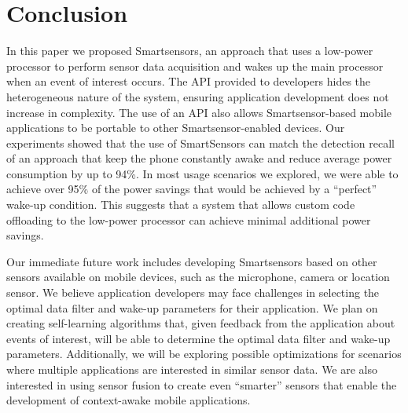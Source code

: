 \section{Conclusion}
\label{sec:conclusion}

In this paper we proposed Smartsensors, an approach that uses a low-power processor to perform sensor data acquisition and wakes up the main processor when an event of interest occurs. The API provided to developers hides the heterogeneous nature of the system, ensuring application development does not increase in complexity. The use of an API also allows Smartsensor-based mobile applications to be portable to other Smartsensor-enabled devices. Our experiments showed that the use of SmartSensors can match the detection recall of an approach that keep the phone constantly awake and reduce average power consumption by up to 94\%. In most usage scenarios we explored, we were able to achieve over 95\% of the power savings that would be achieved by a ``perfect'' wake-up condition. This suggests that a system that allows custom code offloading to the low-power processor can achieve minimal additional power savings.

Our immediate future work includes developing Smartsensors based on other sensors available on mobile devices, such as the microphone, camera or location sensor. We believe application developers may face challenges in selecting the optimal data filter and wake-up parameters for their application. We plan on creating self-learning algorithms that, given feedback from the application about events of interest, will be able to determine the optimal data filter and wake-up parameters. Additionally, we will be exploring possible optimizations for scenarios where multiple applications are interested in similar sensor data. We are also interested in using sensor fusion to create even ``smarter'' sensors that enable the development of context-awake mobile applications.
